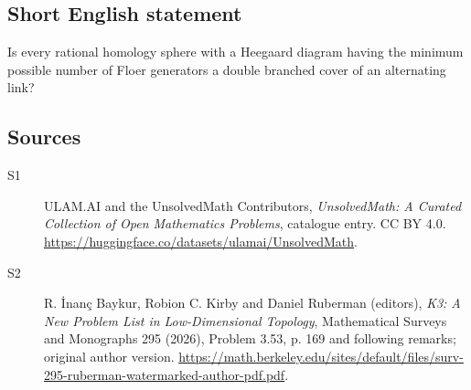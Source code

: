 \documentclass[11pt]{article}
\begin{document}
\subsection{Short English statement}
Is every rational homology sphere with a Heegaard diagram having the minimum possible number of Floer generators a double branched cover of an alternating link?
\subsection{Sources}
\begin{description}
\item[\hypertarget{source:statement:1}{S1}] ULAM.AI and the UnsolvedMath Contributors, \emph{UnsolvedMath: A Curated Collection of Open Mathematics Problems}, catalogue entry. CC BY 4.0. \url{https://huggingface.co/datasets/ulamai/UnsolvedMath}.
\item[\hypertarget{source:statement:2}{S2}] R. İnanç Baykur, Robion C. Kirby and Daniel Ruberman (editors), \emph{K3: A New Problem List in Low-Dimensional Topology}, Mathematical Surveys and Monographs 295 (2026), Problem 3.53, p. 169 and following remarks; original author version. \url{https://math.berkeley.edu/sites/default/files/surv-295-ruberman-watermarked-author-pdf.pdf}.
\end{description}
\label{end:statement}
\end{document}
